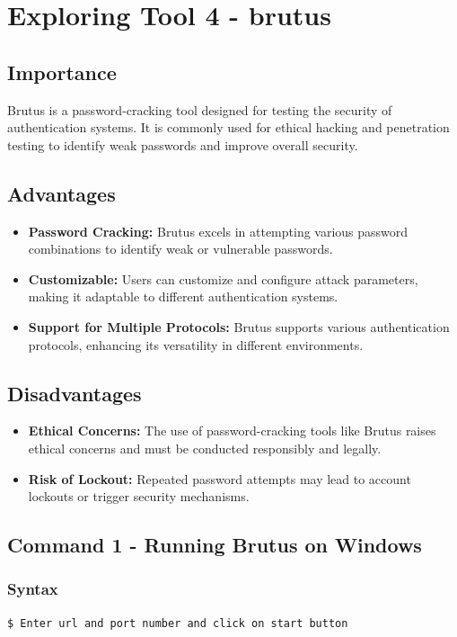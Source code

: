 \documentclass[11pt]{article}
\begin{document}
\section{Exploring Tool 4 - brutus}
\subsection{Importance}
Brutus is a password-cracking tool designed for testing the security of authentication systems. It is commonly used for ethical hacking and penetration testing to identify weak passwords and improve overall security.

\subsection{Advantages}
\begin{itemize}
    \item \textbf{Password Cracking:} Brutus excels in attempting various password combinations to identify weak or vulnerable passwords.
    \item \textbf{Customizable:} Users can customize and configure attack parameters, making it adaptable to different authentication systems.
    \item \textbf{Support for Multiple Protocols:} Brutus supports various authentication protocols, enhancing its versatility in different environments.
\end{itemize}

\subsection{Disadvantages}
\begin{itemize}
    \item \textbf{Ethical Concerns:} The use of password-cracking tools like Brutus raises ethical concerns and must be conducted responsibly and legally.
    \item \textbf{Risk of Lockout:} Repeated password attempts may lead to account lockouts or trigger security mechanisms.
\end{itemize}


\subsection{Command 1 - Running Brutus on Windows}

\subsubsection*{Syntax}
\begin{verbatim}
$ Enter url and port number and click on start button
\end{verbatim}
\end{document}
